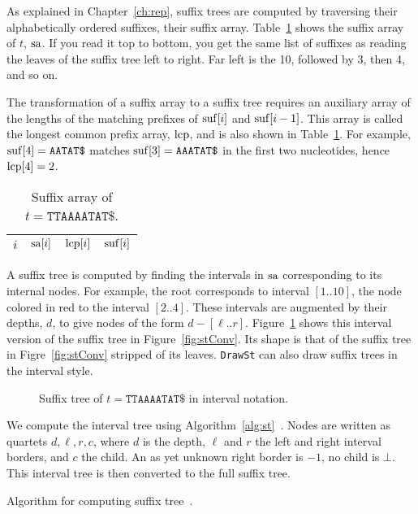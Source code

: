 As explained in Chapter~\ref{ch:rep}, suffix trees are computed by
traversing their alphabetically ordered suffixes, their suffix
array. Table~\ref{tab:sa} shows the suffix array of $t$, $\mathrm{sa}$. If you
read it top to bottom, you get the same list of suffixes as reading
the leaves of the suffix tree left to right. Far left is the 10,
followed by 3, then 4, and so on.

The transformation of a suffix array to a suffix tree requires an
auxiliary array of the lengths of the matching prefixes of $\mathrm{suf}[i]$
and $\mathrm{suf}[i-1]$. This array is called the longest common prefix array,
$\mathrm{lcp}$, and is also shown in Table~\ref{tab:sa}. For example,
$\mathrm{suf}[4]=\texttt{AATAT\$}$ matches $\mathrm{suf}[3]=\texttt{AAATAT\$}$ in the
first two nucleotides, hence $\mathrm{lcp}[4]=2$.

\begin{table}
  \caption{Suffix array of $t=\texttt{TTAAAATAT\$}$.}\label{tab:sa}
  \begin{center}
  \begin{tabular}{cccl}
    \hline
    $i$ & $\mathrm{sa}[i]$ & $\mathrm{lcp}[i]$ & $\mathrm{suf}[i]$\\\hline
    
    \hline
  \end{tabular}
  \end{center}
\end{table}

A suffix tree is computed by finding the intervals in $\mathrm{sa}$
corresponding to its internal nodes. For example, the root corresponds
to interval $[1..10]$, the node colored in red to the interval
$[2..4]$. These intervals are augmented by their depths, $d$, to give
nodes of the form $d-[\ell..r]$. Figure~\ref{fig:stInt} shows this
interval version of the suffix tree in Figure~\ref{fig:stConv}. Its
shape is that of the suffix tree in Figre~\ref{fig:stConv} stripped of
its leaves. \texttt{DrawSt} can also draw suffix trees in the interval
style.

\begin{figure}
  \begin{center}
    
  \end{center}
  \caption{Suffix tree of $t=\texttt{TTAAAATAT\$}$ in interval
    notation.}\label{fig:stInt}
\end{figure}

We compute the interval tree using
Algorithm~\ref{alg:st}~\cite[p. 94]{ohl13:bio}. Nodes are written as
quartets $d, \ell, r, c$, where $d$ is the depth, $\ell$ and $r$ the
left and right interval borders, and $c$ the child. An as yet unknown
right border is $-1$, no child is $\bot$. This interval tree is then
converted to the full suffix tree.
\begin{algorithm}
  \caption{Algorithm for computing suffix
    tree~\cite[p. 94]{ohl13:bio}.}\label{alg:st}
  \begin{algorithmic}
    
  \end{algorithmic}
\end{algorithm}

